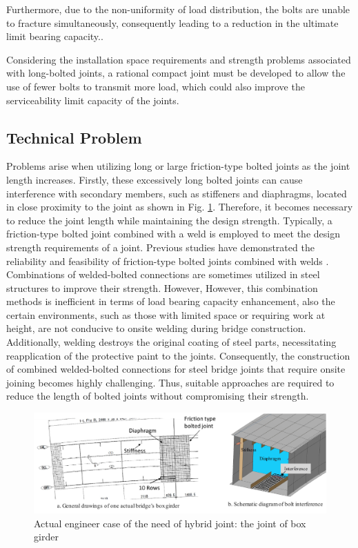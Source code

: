 Furthermore, due to the non-uniformity of load distribution, the bolts are unable to fracture simultaneously, consequently leading to a reduction in the ultimate limit bearing capacity.\cite{Takai2021BoltUnbuttoning,Peng2013FeaDimensions,peng2010}.

Considering the installation space requirements and strength problems associated with long-bolted joints, a rational compact joint must be developed to allow the use of fewer bolts to transmit more load, which could also improve the serviceability limit capacity of the joints.

\subsection{Technical Problem} %
Problems arise when utilizing long or large friction-type bolted joints as the joint length increases. Firstly, these excessively long bolted joints can cause interference with secondary members, such as stiffeners and diaphragms, located in close proximity to the joint as shown in Fig. \ref{fig-boxhsbinter}. Therefore, it becomes necessary to reduce the joint length while maintaining the design strength. Typically, a friction-type bolted joint combined with a weld is employed to meet the design strength requirements of a joint. Previous studies have demonstrated the reliability and feasibility of friction-type bolted joints combined with welds \cite{solodov2021,Thomas2000,Chang2019361,KHANDEL2022107036}. Combinations of welded-bolted connections are sometimes utilized in steel structures to improve their strength. However, However, this combination methods is inefficient in terms of load bearing capacity enhancement, also the certain environments, such as those with limited space or requiring work at height, are not conducive to onsite welding during bridge construction. Additionally, welding destroys the original coating of steel parts, necessitating reapplication of the protective paint to the joints. Consequently, the construction of combined welded-bolted connections for steel bridge joints that require onsite joining becomes highly challenging. Thus, suitable approaches are required to reduce the length of bolted joints without compromising their strength.

\begin{figure}[htbp]
    \centering
    \includegraphics[width=1\linewidth]{imgs//ch2/boxhsbinter.pdf}
    \caption{Actual engineer case of the need of hybrid joint: the joint of box girder}
    \label{fig-boxhsbinter}
\end{figure}

